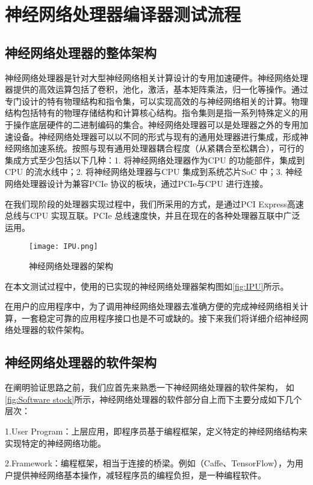 \chapter{神经网络处理器编译器测试流程}
\section{神经网络处理器的整体架构}
神经网络处理器是针对大型神经网络相关计算设计的专用加速硬件。神经网络处理器提供的高效运算包括了卷积，池化，激活，基本矩阵乘法，归一化等操作。通过专门设计的特有物理结构和指令集，可以实现高效的与神经网络相关的计算。物理结构包括特有的物理存储结构和计算核心结构。指令集则是指一系列特殊定义的用于操作底层硬件的二进制编码的集合。神经网络处理器可以是处理器之外的专用加速设备。神经网络处理器可以以不同的形式与现有的通用处理器进行集成，形成神经网络加速系统。按照与现有通用处理器耦合程度（从紧耦合至松耦合），可行的集成方式至少包括以下几种：1. 将神经网络处理器作为CPU 的功能部件，集成到CPU 的流水线中；2. 将神经网络处理器与CPU 集成到系统芯片SoC 中；3. 神经网络处理器设计为兼容PCIe 协议的板块，通过PCIe与CPU 进行连接。

在我们现阶段的处理器实现过程中，我们所采用的方式，是通过PCI Express高速总线与CPU 实现互联。PCIe 总线速度快，并且在现在的各种处理器互联中广泛运用。

\begin{figure}[!htbp]
\centering
\texttt{[image: IPU.png]}
\caption{神经网络处理器的架构}
\label{fig:IPU}
\end{figure}

在本文测试过程中，使用的已实现的神经网络处理器架构图如\autoref{fig:IPU}所示。

在用户的应用程序中，为了调用神经网络处理器去准确方便的完成神经网络相关计算，一套稳定可靠的应用程序接口也是不可或缺的。接下来我们将详细介绍神经网络处理器的软件架构。

\section{神经网络处理器的软件架构}
在阐明验证思路之前，我们应首先来熟悉一下神经网络处理器的软件架构， 如\autoref{fig:Software stock}所示，神经网络处理器的软件部分自上而下主要分成如下几个层次：

1.User Program：上层应用，即程序员基于编程框架，定义特定的神经网络结构来实现特定的神经网络功能。

2.Framework：编程框架，相当于连接的桥梁。例如（Caffe、TensorFlow），为用户提供神经网络基本操作，减轻程序员的编程负担，是一种编程软件。

